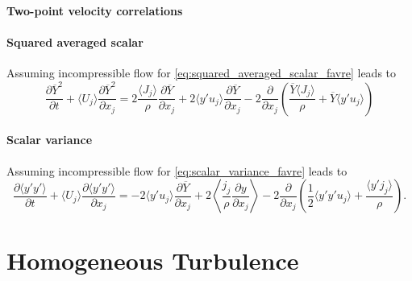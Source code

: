 \documentclass[oneside,a4paper,11pt]{report}
\newcommand{\yavg}{\overline{Y}}
\newcommand{\yfluc}{y'}
\newcommand{\ujavg}{\langle U_j \rangle}
\newcommand{\ujfluc}{u_j}
\begin{document}
\subsection{Two-point velocity correlations}

\subsection{Squared averaged scalar}
Assuming incompressible flow for \cref{eq:squared_averaged_scalar_favre} leads to
\begin{equation}
    \frac{\partial \yavg ^2}{\partial t} + \ujavg \frac{\partial \yavg^2}{\partial x_j} = 2\frac{\langle J_j \rangle}{\rho} \frac{\partial \yavg}{\partial x_j} + 2\langle \yfluc \ujfluc \rangle \frac{\partial \yavg}{\partial x_j} - 2\frac{\partial}{\partial x_j} \left ( \frac{\yavg \langle J_j \rangle}{\rho} + \yavg \langle \yfluc \ujfluc \rangle \right )
\end{equation}

\subsection{Scalar variance}
Assuming incompressible flow for \cref{eq:scalar_variance_favre} leads to
\begin{equation}
    \label{eq:scalar_variance_rans}
    \frac{\partial \langle \yfluc \yfluc \rangle}{\partial t} + \ujavg \frac{\partial  \langle \yfluc \yfluc \rangle }{\partial x_j} = -2 \langle \yfluc \ujfluc \rangle \frac{\partial \yavg}{\partial x_j} + 2 \left < \frac{j_j}{\rho} \frac{\partial y}{\partial x_j} \right > - 2 \frac{\partial}{\partial x_j} \left ( \frac{1}{2} \langle \yfluc \yfluc \ujfluc \rangle +  \frac{ \langle \yfluc j_j \rangle}{\rho} \right).
\end{equation}

\part{Homogeneous Turbulence}
%
\end{document}
